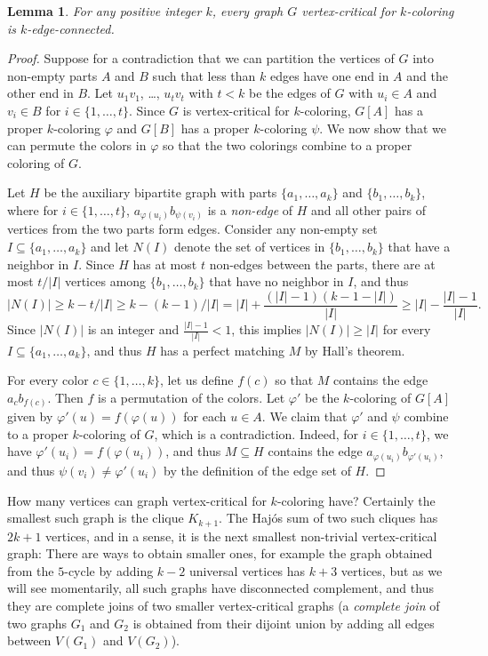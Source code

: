 \documentclass[12pt,twoside,openright,a4paper]{book}
\newtheorem{lemma}[theorem]{Lemma}
\begin{document}
\begin{lemma}\label{lemma:cr-econ}
For any positive integer $k$, every graph $G$ vertex-critical for $k$-coloring is $k$-edge-connected.
\end{lemma}
\begin{proof}
Suppose for a contradiction that we can partition the vertices of $G$ into non-empty parts $A$ and $B$ such that less than $k$ edges have one end in $A$ and the other end in $B$.
Let $u_1v_1$, \ldots, $u_tv_t$ with $t<k$ be the edges of $G$ with $u_i\in A$ and $v_i\in B$ for $i\in\{1,\ldots,t\}$.  Since $G$ is vertex-critical for $k$-coloring,
$G[A]$ has a proper $k$-coloring $\varphi$ and $G[B]$ has a proper $k$-coloring $\psi$.  We now show that we can permute the colors in $\varphi$ so that the two colorings combine to
a proper coloring of $G$.

Let $H$ be the auxiliary bipartite graph with parts $\{a_1,\ldots, a_k\}$ and $\{b_1,\ldots,b_k\}$,
where for $i\in\{1,\ldots,t\}$, $a_{\varphi(u_i)}b_{\psi(v_i)}$ is a \emph{non-edge} of $H$ and all other pairs of vertices from the two parts form edges.
Consider any non-empty set $I\subseteq \{a_1,\ldots, a_k\}$ and let $N(I)$ denote the set of vertices in $\{b_1,\ldots,b_k\}$ that have a neighbor in $I$.
Since $H$ has at most $t$ non-edges between the parts, there are at most $t/|I|$ vertices among $\{b_1,\ldots,b_k\}$ that have no neighbor in $I$, and thus 
$$|N(I)|\ge k-t/|I|\ge k-(k-1)/|I|=|I|+\frac{(|I|-1)(k-1-|I|)}{|I|}\ge |I|-\frac{|I|-1}{|I|}.$$
Since $|N(I)|$ is an integer and $\tfrac{|I|-1}{|I|}<1$, this implies $|N(I)|\ge |I|$ for every $I\subseteq \{a_1,\ldots, a_k\}$,
and thus $H$ has a perfect matching $M$ by Hall's theorem.

For every color $c\in\{1,\ldots,k\}$, let us define $f(c)$ so that $M$ contains the edge $a_cb_{f(c)}$.  Then $f$ is a permutation of the colors.
Let $\varphi'$ be the $k$-coloring of $G[A]$ given by $\varphi'(u)=f(\varphi(u))$ for each $u\in A$.  We claim that $\varphi'$ and $\psi$ combine to a proper $k$-coloring of $G$, which is a contradiction.
Indeed, for $i\in\{1,\ldots,t\}$, we have $\varphi'(u_i)=f(\varphi(u_i))$, and thus $M\subseteq H$ contains the edge $a_{\varphi(u_i)}b_{\varphi'(u_i)}$, and thus
$\psi(v_i)\neq \varphi'(u_i)$ by the definition of the edge set of $H$.
\end{proof}

How many vertices can graph vertex-critical for $k$-coloring have?  Certainly the smallest such graph is the clique $K_{k+1}$.
The Haj\'os sum of two such cliques has $2k+1$ vertices, and in a sense, it is the next smallest non-trivial vertex-critical graph:
There are ways to obtain smaller ones, for example the graph obtained from the $5$-cycle by adding $k-2$ universal vertices has $k+3$
vertices, but as we will see momentarily, all such graphs have disconnected complement, and thus they are complete joins of two smaller
vertex-critical graphs (a \emph{complete join} of two graphs $G_1$ and $G_2$ is obtained from their dijoint union by adding all edges between $V(G_1)$ and $V(G_2)$).
\end{document}
